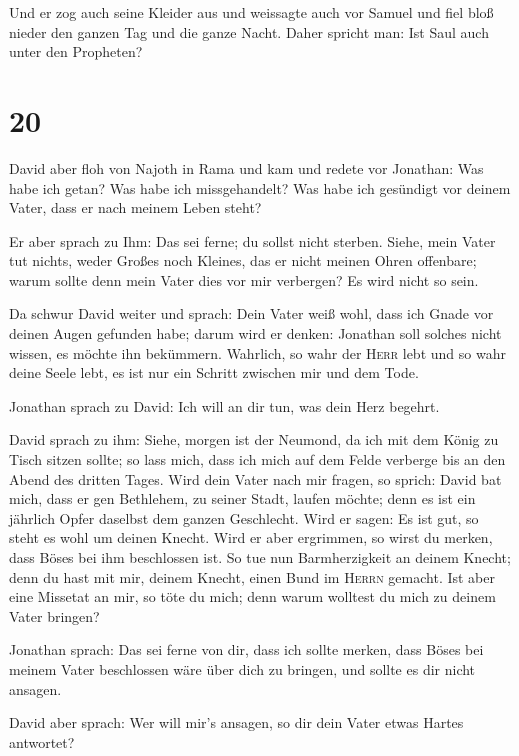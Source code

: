 Und er zog auch seine Kleider aus und weissagte auch vor
Samuel und fiel bloß nieder den ganzen Tag und die ganze Nacht. Daher
spricht man: Ist Saul auch unter den Propheten?

\hypertarget{section-19}{%
\section{20}\label{section-19}}

 David aber floh von Najoth in Rama und kam und redete vor
Jonathan: Was habe ich getan? Was habe ich missgehandelt? Was habe ich
gesündigt vor deinem Vater, dass er nach meinem Leben steht?

 Er aber sprach zu Ihm: Das sei ferne; du sollst nicht
sterben. Siehe, mein Vater tut nichts, weder Großes noch Kleines, das er
nicht meinen Ohren offenbare; warum sollte denn mein Vater dies vor mir
verbergen? Es wird nicht so sein.

 Da schwur David weiter und sprach: Dein Vater weiß wohl,
dass ich Gnade vor deinen Augen gefunden habe; darum wird er denken:
Jonathan soll solches nicht wissen, es möchte ihn bekümmern. Wahrlich,
so wahr der \textsc{Herr} lebt und so wahr deine Seele lebt, es ist nur
ein Schritt zwischen mir und dem Tode.

 Jonathan sprach zu David: Ich will an dir tun, was dein
Herz begehrt.

 David sprach zu ihm: Siehe, morgen ist der Neumond, da
ich mit dem König zu Tisch sitzen sollte; so lass mich, dass ich mich
auf dem Felde verberge bis an den Abend des dritten Tages.
 Wird dein Vater nach mir fragen, so sprich: David bat
mich, dass er gen Bethlehem, zu seiner Stadt, laufen möchte; denn es ist
ein jährlich Opfer daselbst dem ganzen Geschlecht.  Wird
er sagen: Es ist gut, so steht es wohl um deinen Knecht. Wird er aber
ergrimmen, so wirst du merken, dass Böses bei ihm beschlossen ist.
 So tue nun Barmherzigkeit an deinem Knecht; denn du hast
mit mir, deinem Knecht, einen Bund im \textsc{Herrn} gemacht. Ist aber
eine Missetat an mir, so töte du mich; denn warum wolltest du mich zu
deinem Vater bringen?

 Jonathan sprach: Das sei ferne von dir, dass ich sollte
merken, dass Böses bei meinem Vater beschlossen wäre über dich zu
bringen, und sollte es dir nicht ansagen.

 David aber sprach: Wer will mir's ansagen, so dir dein
Vater etwas Hartes antwortet?

